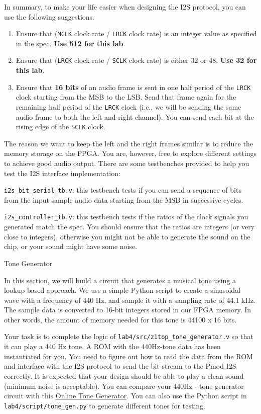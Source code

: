 \documentclass[11pt]{article}
\makeatletter
\renewcommand{\subsection}
{\@startsection {subsection}{1}{0pt}
 {-1ex}
 {0.5ex}
 {\bfseries\normalsize}}
\makeatother
\begin{document}
In summary, to make your life easier when designing the I2S protocol, you can use the following suggestions.

\begin{enumerate}
  \item Ensure that (\verb|MCLK| clock rate / \verb|LRCK| clock rate) is an integer value as specified in the spec. \textbf{Use 512 for this lab}.
  \item Ensure that (\verb|LRCK| clock rate / \verb|SCLK| clock rate) is either 32 or 48. \textbf{Use 32 for this lab}.
  \item Ensure that \textbf{16 bits} of an audio frame is sent in one half period of the \verb|LRCK| clock starting from the MSB to the LSB. Send that frame again for the remaining half period of the \verb|LRCK| clock (i.e., we will be sending the same audio frame to both the left and right channel). You can send each bit at the rising edge of the \verb|SCLK| clock.
\end{enumerate}

The reason we want to keep the left and the right frames similar is to reduce the memory storage on the FPGA. You are, however, free to explore different settings to achieve good audio output. There are some testbenches provided to help you test the I2S interface implementation:

\verb|i2s_bit_serial_tb.v|: this testbench tests if you can send a sequence of bits from the input sample audio data starting from the MSB in successive cycles.

\verb|i2s_controller_tb.v|: this testbench tests if the ratios of the clock signals you generated match the spec. You should ensure that the ratios are integers (or very close to integers), otherwise you might not be able to generate the sound on the chip, or your sound might have some noise.

\subsection{Tone Generator}

In this section, we will build a circuit that generates a musical tone using a lookup-based approach. We use a simple Python script to create a sinusoidal wave with a frequency of 440 Hz, and sample it with a sampling rate of 44.1 kHz. The sample data is converted to 16-bit integers stored in our FPGA memory. In other words, the amount of memory needed for this tone is 44100 x 16 bits.

Your task is to complete the logic of \verb|lab4/src/z1top_tone_generator.v| so that it can play a 440 Hz tone. A ROM with the 440Hz-tone data has been instantiated for you. You need to figure out how to read the data from the ROM and interface with the I2S protocol to send the bit stream to the Pmod I2S correctly. It is expected that your design should be able to play a clean sound (minimum noise is acceptable). You can compare your 440Hz - tone generator circuit with this \href{https://www.szynalski.com/tone-generator}{Online Tone Generator}. You can also use the Python script in \verb|lab4/script/tone_gen.py| to generate different tones for testing.
\end{document}
